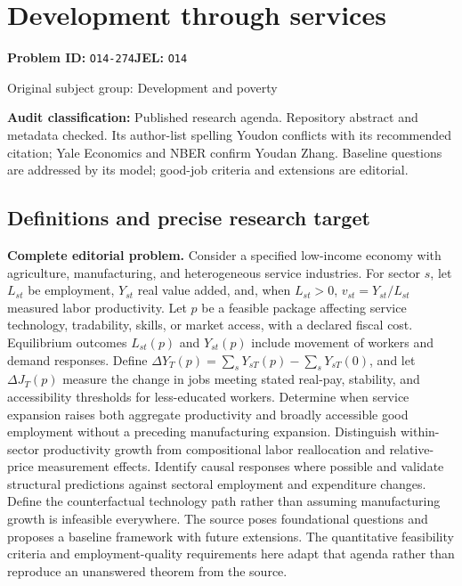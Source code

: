 \documentclass[11pt,a4paper]{article}
\begin{document}
\section*{Development through services}
\textbf{Problem ID:} \texttt{O14-274}\quad \textbf{JEL:} \texttt{O14}\par
\label{problem:OP-0378}
{\sffamily\small\color{muted}Original subject group: Development and poverty\par}
\label{definitions:problem:30007660}
\textbf{Audit classification:} Published research agenda. Repository abstract and metadata checked. Its author-list spelling Youdon conflicts with its recommended citation; Yale Economics and NBER confirm Youdan Zhang. Baseline questions are addressed by its model; good-job criteria and extensions are editorial.
\subsection*{Definitions and precise research target}
\textbf{Complete editorial problem.} Consider a specified low-income economy with agriculture, manufacturing, and heterogeneous service industries. For sector \(s\), let \(L_{st}\) be employment, \(Y_{st}\) real value added, and, when \(L_{st}>0\), \(v_{st}=Y_{st}/L_{st}\) measured labor productivity. Let \(p\) be a feasible package affecting service technology, tradability, skills, or market access, with a declared fiscal cost. Equilibrium outcomes \(L_{st}(p)\) and \(Y_{st}(p)\) include movement of workers and demand responses. Define \(\Delta Y_T(p)=\sum_sY_{sT}(p)-\sum_sY_{sT}(0)\), and let \(\Delta J_T(p)\) measure the change in jobs meeting stated real-pay, stability, and accessibility thresholds for less-educated workers. Determine when service expansion raises both aggregate productivity and broadly accessible good employment without a preceding manufacturing expansion. Distinguish within-sector productivity growth from compositional labor reallocation and relative-price measurement effects. Identify causal responses where possible and validate structural predictions against sectoral employment and expenditure changes. Define the counterfactual technology path rather than assuming manufacturing growth is infeasible everywhere. The source poses foundational questions and proposes a baseline framework with future extensions. The quantitative feasibility criteria and employment-quality requirements here adapt that agenda rather than reproduce an unanswered theorem from the source.
\end{document}
